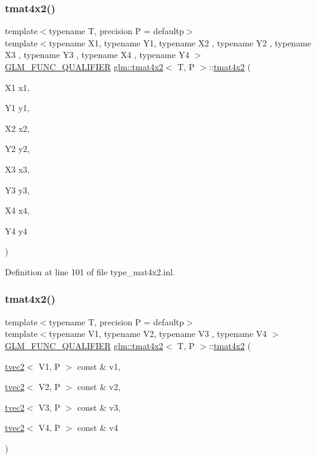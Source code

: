 \subsubsection{\texorpdfstring{tmat4x2()}{tmat4x2()}\hspace{0.1cm}{\footnotesize\ttfamily [20/22]}}
{\footnotesize\ttfamily template$<$typename T, precision P = defaultp$>$ \\
template$<$typename X1, typename Y1, typename X2 , typename Y2 , typename X3 , typename Y3 , typename X4 , typename Y4 $>$ \\
\mbox{\hyperlink{setup_8hpp_a33fdea6f91c5f834105f7415e2a64407}{G\+L\+M\+\_\+\+F\+U\+N\+C\+\_\+\+Q\+U\+A\+L\+I\+F\+I\+ER}} \mbox{\hyperlink{structglm_1_1tmat4x2}{glm\+::tmat4x2}}$<$ T, P $>$\+::\mbox{\hyperlink{structglm_1_1tmat4x2}{tmat4x2}} (\begin{DoxyParamCaption}\item[{X1}]{x1,  }\item[{Y1}]{y1,  }\item[{X2}]{x2,  }\item[{Y2}]{y2,  }\item[{X3}]{x3,  }\item[{Y3}]{y3,  }\item[{X4}]{x4,  }\item[{Y4}]{y4 }\end{DoxyParamCaption})}



Definition at line 101 of file type\+\_\+mat4x2.\+inl.

\mbox{\label{structglm_1_1tmat4x2_a3d41b266dfeb276e13db820296663cea}} 
\subsubsection{\texorpdfstring{tmat4x2()}{tmat4x2()}\hspace{0.1cm}{\footnotesize\ttfamily [21/22]}}
{\footnotesize\ttfamily template$<$typename T, precision P = defaultp$>$ \\
template$<$typename V1, typename V2, typename V3 , typename V4 $>$ \\
\mbox{\hyperlink{setup_8hpp_a33fdea6f91c5f834105f7415e2a64407}{G\+L\+M\+\_\+\+F\+U\+N\+C\+\_\+\+Q\+U\+A\+L\+I\+F\+I\+ER}} \mbox{\hyperlink{structglm_1_1tmat4x2}{glm\+::tmat4x2}}$<$ T, P $>$\+::\mbox{\hyperlink{structglm_1_1tmat4x2}{tmat4x2}} (\begin{DoxyParamCaption}\item[{\mbox{\hyperlink{structglm_1_1tvec2}{tvec2}}$<$ V1, P $>$ const \&}]{v1,  }\item[{\mbox{\hyperlink{structglm_1_1tvec2}{tvec2}}$<$ V2, P $>$ const \&}]{v2,  }\item[{\mbox{\hyperlink{structglm_1_1tvec2}{tvec2}}$<$ V3, P $>$ const \&}]{v3,  }\item[{\mbox{\hyperlink{structglm_1_1tvec2}{tvec2}}$<$ V4, P $>$ const \&}]{v4 }\end{DoxyParamCaption})}



